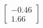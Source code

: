 \documentclass[preview]{standalone}
\begin{document}
\begin{align*}
\begin{bmatrix} -0.46 \\ 1.66 \end{bmatrix}
\end{align*}
\end{document}

